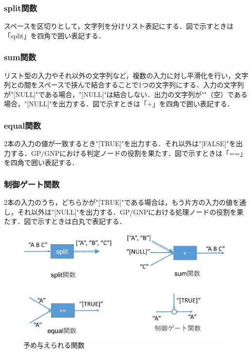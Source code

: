 \documentclass[exploratorypaper]{jsaiart} %
\begin{document}
\subsubsection{split関数}
スペースを区切りとして，文字列を分けリスト表記にする．図で示すときは「split」を四角で囲い表記する．


\subsubsection{sum関数}
リスト型の入力やそれ以外の文字列など，複数の入力に対し平滑化を行い，文字列との間をスペースで挟んで結合することで1つの文字列にする．入力の文字列が"[NULL]"である場合，"[NULL]"は結合しない．出力の文字列が""（空）である場合，"[NULL]"を出力する．図で示すときは「+」を四角で囲い表記する．

\subsubsection{equal関数}
2本の入力の値が一致するとき"[TRUE]"を出力する．それ以外は"[FALSE]"を出力する．GP/GNPにおける判定ノードの役割を果たす．図で示すときは「==」を四角で囲い表記する．

\subsubsection{制御ゲート関数}
2本の入力のうち，どちらかが"[TRUE]"である場合は，もう片方の入力の値を通し，それ以外は"[NULL]"を出力する．GP/GNPにおける処理ノードの役割を果たす．図で示すときは白丸で表記する．

\begin{figure}[t]
    \begin{center}
        \includegraphics[width=110mm]{func.jpg}
    \end{center}
    \capwidth=90mm %
    \caption{予め与えられる関数}
    \label{fig:func}
\end{figure}
\end{document}

